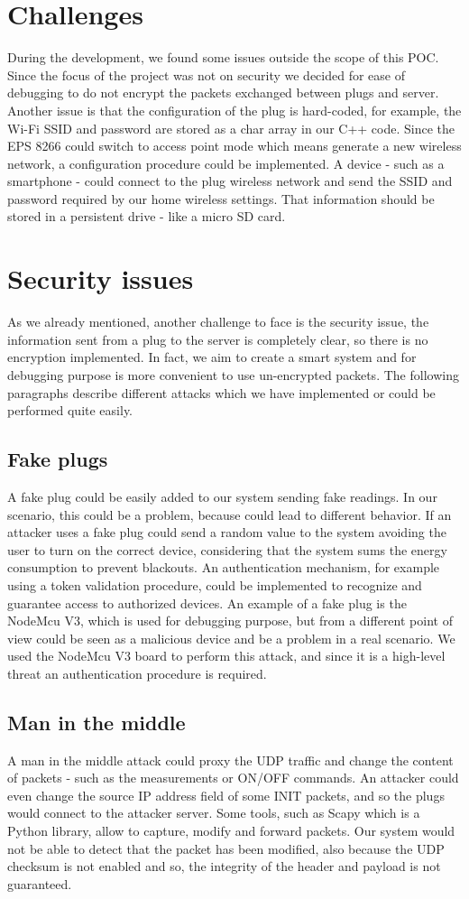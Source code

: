 \documentclass[conference]{IEEEtran}
\begin{document}
	\section{Challenges}
	During the development, we found some issues outside the scope of this POC. Since the focus of the project was not on security we decided for ease of debugging to do not encrypt the packets exchanged between plugs and server. Another issue is that the configuration of the plug is hard-coded, for example, the Wi-Fi SSID and password are stored as a char array in our C++ code. Since the EPS 8266 could switch to access point mode which means generate a new wireless network, a configuration procedure could be implemented. A device - such as a smartphone - could connect to the plug wireless network and send the SSID and password required by our home wireless settings. That information should be stored in a persistent drive - like a micro SD card.
	\section{Security issues}
	As we already mentioned, another challenge to face is the security issue, the information sent from a plug to the server is completely clear, so there is no encryption implemented. 
	In fact, we aim to create a smart system and for debugging purpose is more convenient to use un-encrypted packets.
	The following paragraphs describe different attacks which we have implemented or could be performed quite easily.
	\subsection{Fake plugs}
	A fake plug could be easily added to our system sending fake readings. In our scenario, this could be a problem, because could lead to different behavior.
	If an attacker uses a fake plug could send a random value to the system avoiding the user to turn on the correct device, considering that the system sums the energy consumption to prevent blackouts. An authentication mechanism, for example using a token validation procedure, could be implemented to recognize and guarantee access to authorized devices. An example of a fake plug is the NodeMcu V3, which is used for debugging purpose, but from a different point of view could be seen as a malicious device and be a problem in a real scenario. We used the NodeMcu V3 board to perform this attack, and since it is a high-level threat an authentication procedure is required.
	\subsection{Man in the middle}
	A man in the middle attack could proxy the UDP traffic and change the content of packets - such as the measurements or ON/OFF commands. 
	An attacker could even change the source IP address field of some INIT packets, and so the plugs would connect to the attacker server.
	Some tools, such as Scapy which is a Python library, allow to capture, modify and forward packets. Our system would not be able to detect that the packet has been modified, 
	also because the UDP checksum is not enabled and so, the integrity of the header and payload is not guaranteed.
\end{document}
